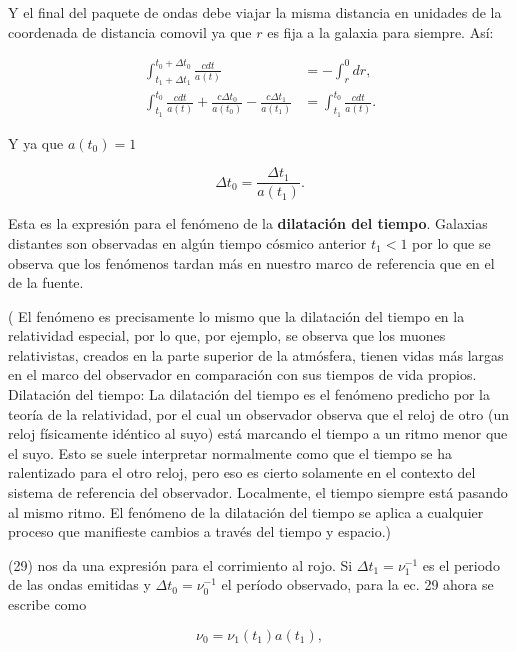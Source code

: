 \documentclass{article}
\begin{document}
Y el final del paquete de ondas debe viajar la misma distancia en unidades de la coordenada de distancia comovil ya que $r$ es fija a la galaxia para siempre. Así:

    \begin{align} 
        \int_{t_1 + \Delta t_1}^{t_0 + \Delta t_0}{ \frac{cdt}{a(t)}} & = - \int_r^0{dr}, \\
        \int_{t_1}^{t_0}{ \frac{cdt}{a(t)} +  \frac{c \Delta t_0}{a(t_0)} -\frac{c \Delta t_1}{a(t_1) }}   & =  \int_{t_1}^{t_0}{ \frac{cdt}{a(t)}}. 
     \end{align}

 Y ya que $a(t_0) = 1$

    \begin{equation}
        \Delta t_0 = \frac{\Delta t_1}{a(t_1)}.
    \end{equation}


Esta es la expresión para el fenómeno de la {\bf{dilatación del tiempo}}. Galaxias distantes son observadas en algún tiempo cósmico anterior $t_1 < 1$ por lo que se observa que los fenómenos tardan más en nuestro marco de referencia que en el de la fuente. 

( El fenómeno es precisamente lo mismo que la dilatación del tiempo en la relatividad especial, por lo que, por ejemplo, se observa que los muones relativistas, creados en la parte superior de la atmósfera, tienen vidas más largas en el marco del observador en comparación con sus tiempos de vida propios. 
Dilatación del tiempo: La dilatación del tiempo es el fenómeno predicho por la teoría de la relatividad, por el cual un observador observa que el reloj de otro (un reloj físicamente idéntico al suyo) está marcando el tiempo a un ritmo menor que el suyo. Esto se suele interpretar normalmente como que el tiempo se ha ralentizado para el otro reloj, pero eso es cierto solamente en el contexto del sistema de referencia del observador. Localmente, el tiempo siempre está pasando al mismo ritmo. El fenómeno de la dilatación del tiempo se aplica a cualquier proceso que manifieste cambios a través del tiempo y espacio.)


(29) nos da una expresión para el corrimiento al rojo. Si $\Delta t_1 = \nu_1^{-1}$ es el periodo de las ondas emitidas y  $\Delta t_0 = \nu_0^{-1}$ el período observado, para la ec. 29 ahora se escribe como

\begin{equation}
    \nu_0 = \nu_1(t_1) a(t_1),
\end{equation}
\end{document}
